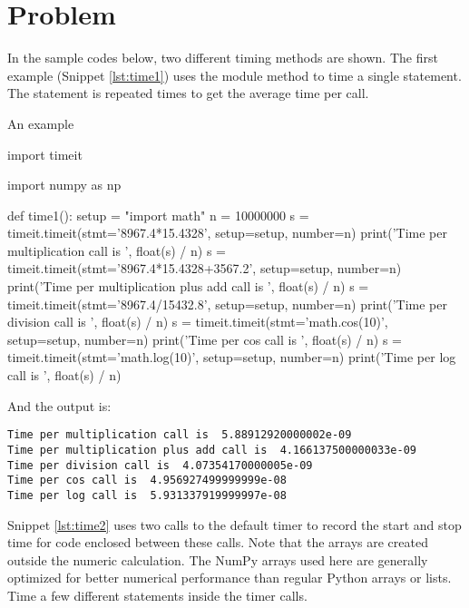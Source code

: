 \section{Problem \thesection}

In the sample codes below, two different timing methods are shown. The first example
(Snippet \ref{lst:time1}) uses the
 module method  to time a single statement.
The statement is repeated  times to get the average time per call.

\begin{algorithm}[H]
    \caption{An example}
    \label{lst:time1}
    \begin{pythoncode}
        import timeit

        import numpy as np


        def time1():
            setup = "import math"
            n = 10000000
            s = timeit.timeit(stmt='8967.4*15.4328', setup=setup, number=n)
            print('Time per multiplication call is ', float(s) / n)
            s = timeit.timeit(stmt='8967.4*15.4328+3567.2', setup=setup, number=n)
            print('Time per multiplication plus add call is ', float(s) / n)
            s = timeit.timeit(stmt='8967.4/15432.8', setup=setup, number=n)
            print('Time per division call is ', float(s) / n)
            s = timeit.timeit(stmt='math.cos(10)', setup=setup, number=n)
            print('Time per cos call is ', float(s) / n)
            s = timeit.timeit(stmt='math.log(10)', setup=setup, number=n)
            print('Time per log call is ', float(s) / n)
    \end{pythoncode}
\end{algorithm}

And the output is:

\begin{verbatim}
Time per multiplication call is  5.88912920000002e-09
Time per multiplication plus add call is  4.166137500000033e-09
Time per division call is  4.07354170000005e-09
Time per cos call is  4.956927499999999e-08
Time per log call is  5.931337919999997e-08
\end{verbatim}

Snippet \ref{lst:time2} uses two calls to the default timer to record the start and stop
time for code enclosed between these calls. Note that the arrays are created outside the
numeric calculation. The NumPy arrays used here are generally optimized for better numerical
performance than regular Python arrays or lists. Time a few different statements inside the
timer calls.

